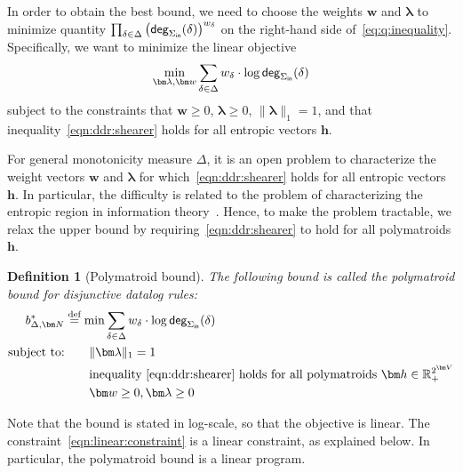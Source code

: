 \documentclass[10pt,a4paper]{article}
\newtheorem{definition}{Definition}[section]
\newcommand{\norm}[1]{\|#1\|}
\newcommand{\degree}{\text{\sf deg}}
\newcommand{\defeq}{\stackrel{\text{def}}{=}}
\newcommand{\Rp}{{\mathbb R}_{\tiny +}} %
\newcommand{\inn}{\text{\sf in}}
\begin{document}
In order to obtain the best bound, we need to choose the weights $\bm w$ and $\bm \lambda$
to minimize quantity $\prod_{\delta \in \Delta} \left(\degree_{\Sigma_{\inn}}(\delta)\right)^{w_\delta}$ on the right-hand side of~\eqref{eq:q:inequality}. Specifically, we want to
minimize the linear objective
\begin{align}
  \min_{\bm \lambda, \bm w} \sum_{\delta \in \Delta} w_\delta \cdot \log \degree_{\Sigma_{\inn}}(\delta)
  \label{eqn:log:objective}
\end{align}
subject to the constraints that $\bm w\geq 0$, $\bm \lambda \geq 0$, $\norm{\bm \lambda}_1=1$,
and that inequality~\eqref{eqn:ddr:shearer} holds for all entropic vectors $\bm h$.

For general monotonicity measure $\Delta$, it is an open problem to characterize
the weight vectors $\bm w$ and $\bm \lambda$ for which~\eqref{eqn:ddr:shearer} holds
for all entropic vectors $\bm h$.
In particular, the difficulty is related to the problem of
characterizing the entropic region in information theory~\cite{Yeung:2008:ITN:1457455}.
Hence, to make the problem tractable, we relax the upper bound by requiring~\eqref{eqn:ddr:shearer}
to hold for all polymatroids $\bm h$.

\begin{definition}[Polymatroid bound]
The following bound is called the {\em polymatroid bound} for disjunctive datalog rules:
\begin{align}
  b^*_{\Delta,\bm N} &\defeq \min \sum_{\delta \in \Delta} w_\delta \cdot \log \degree_{\Sigma_{\inn}}(\delta) \label{eqn:polymatroid:bound}\\
  \text{subject to:} &\qquad \norm{\bm \lambda}_1=1 \nonumber \\
  &\qquad \text{inequality } \eqref{eqn:ddr:shearer} \text{ holds for all polymatroids } \bm h \in \Rp^{2^{\bm V}} \label{eqn:linear:constraint}\\
  &\qquad \bm w \geq 0, \bm \lambda \geq 0 \nonumber
\end{align}
\label{defn:polymatroid:bound}
\end{definition}
Note that the bound is stated in log-scale, so that the objective is linear. The constraint~\eqref{eqn:linear:constraint}
is a linear constraint, as explained below. In particular, the polymatroid bound is a linear program.
\end{document}

